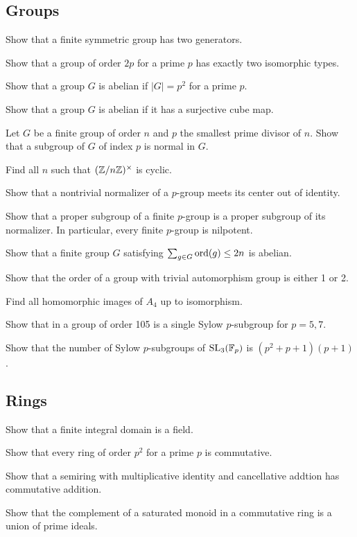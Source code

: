 \documentclass[11pt]{report}
\begin{document}
\subsection{Groups}
\begin{cond}
\item Show that a finite symmetric group has two generators.
\item Show that a group of order $2p$ for a prime $p$ has exactly two isomorphic types.
\item Show that a group $G$ is abelian if $|G|=p^2$ for a prime $p$.
\item Show that a group $G$ is abelian if it has a surjective cube map.
\item Let $G$ be a finite group of order $n$ and $p$ the smallest prime divisor of $n$. Show that a subgroup of $G$ of index $p$ is normal in $G$.
\item Find all $n$ such that $(\mathbb{Z}/n\mathbb{Z})^\times$ is cyclic.
\item Show that a nontrivial normalizer of a $p$-group meets its center out of identity.
\item Show that a proper subgroup of a finite $p$-group is a proper subgroup of its normalizer. In particular, every finite $p$-group is nilpotent.
\item Show that a finite group $G$ satisfying $\sum_{g\in G}\operatorname{ord}(g)\le2n$ is abelian.
\item Show that the order of a group with trivial automorphism group is either 1 or 2.
\item Find all homomorphic images of $A_4$ up to isomorphism.
\item Show that in a group of order 105 is a single Sylow $p$-subgroup for $p=5,7$.
\item Show that the number of Sylow $p$-subgroups of $\mathrm{SL}_3(\mathbb{F}_p)$ is $(p^2+p+1)(p+1)$.
\end{cond}

\subsection{Rings}
\begin{cond}
\item Show that a finite integral domain is a field.
\item Show that every ring of order $p^2$ for a prime $p$ is commutative.
\item Show that a semiring with multiplicative identity and cancellative addtion has commutative addition.
\item Show that the complement of a saturated monoid in a commutative ring is a union of prime ideals.
\end{cond}
\end{document}
